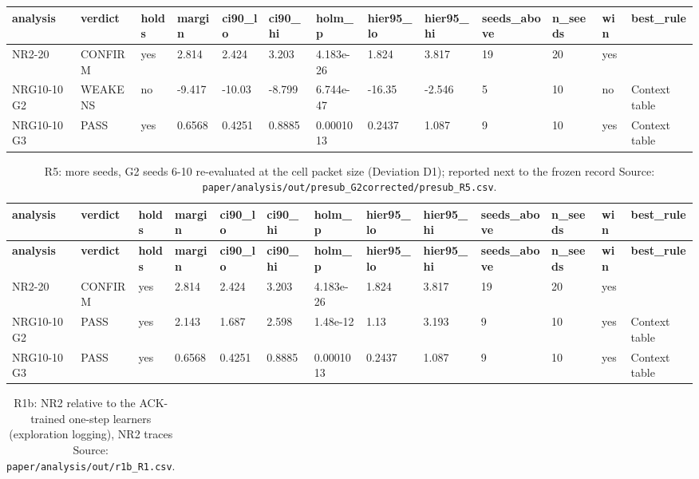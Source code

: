 \documentclass[10pt]{article}
\begin{document}
\begin{landscape}
\begin{longtable}{@{}lllllllllllll@{}}
\endfirsthead
\toprule
\textbf{analysis} & \textbf{verdict} & \textbf{holds} & \textbf{margin} & \textbf{ci90\_lo} & \textbf{ci90\_hi} & \textbf{holm\_p} & \textbf{hier95\_lo} & \textbf{hier95\_hi} & \textbf{seeds\_above} & \textbf{n\_seeds} & \textbf{win} & \textbf{best\_rule} \\
\midrule
\endhead
NR2-20 & CONFIRM & yes & 2.814 & 2.424 & 3.203 & 4.183e-26 & 1.824 & 3.817 & 19 & 20 & yes &  \\
NRG10-10 G2 & WEAKENS & no & -9.417 & -10.03 & -8.799 & 6.744e-47 & -16.35 & -2.546 & 5 & 10 & no & Context table \\
NRG10-10 G3 & PASS & yes & 0.6568 & 0.4251 & 0.8885 & 0.0001013 & 0.2437 & 1.087 & 9 & 10 & yes & Context table \\
\bottomrule
\end{longtable}
\normalsize
\tiny
\setlength{\tabcolsep}{2pt}
\begin{longtable}{@{}lllllllllllll@{}}
\caption{R5: more seeds, G2 seeds 6-10 re-evaluated at the cell packet size (Deviation D1); reported next to the frozen record Source: \texttt{paper/analysis/out/presub\_G2corrected/presub\_R5.csv}.}\\
\toprule
\textbf{analysis} & \textbf{verdict} & \textbf{holds} & \textbf{margin} & \textbf{ci90\_lo} & \textbf{ci90\_hi} & \textbf{holm\_p} & \textbf{hier95\_lo} & \textbf{hier95\_hi} & \textbf{seeds\_above} & \textbf{n\_seeds} & \textbf{win} & \textbf{best\_rule} \\
\midrule
\endfirsthead
\toprule
\textbf{analysis} & \textbf{verdict} & \textbf{holds} & \textbf{margin} & \textbf{ci90\_lo} & \textbf{ci90\_hi} & \textbf{holm\_p} & \textbf{hier95\_lo} & \textbf{hier95\_hi} & \textbf{seeds\_above} & \textbf{n\_seeds} & \textbf{win} & \textbf{best\_rule} \\
\midrule
\endhead
NR2-20 & CONFIRM & yes & 2.814 & 2.424 & 3.203 & 4.183e-26 & 1.824 & 3.817 & 19 & 20 & yes &  \\
NRG10-10 G2 & PASS & yes & 2.143 & 1.687 & 2.598 & 1.48e-12 & 1.13 & 3.193 & 9 & 10 & yes & Context table \\
NRG10-10 G3 & PASS & yes & 0.6568 & 0.4251 & 0.8885 & 0.0001013 & 0.2437 & 1.087 & 9 & 10 & yes & Context table \\
\bottomrule
\end{longtable}
\normalsize
\tiny
\setlength{\tabcolsep}{2pt}
\begin{longtable}{@{}llllllllllll@{}}
\caption{R1b: NR2 relative to the ACK-trained one-step learners (exploration logging), NR2 traces Source: \texttt{paper/analysis/out/r1b\_R1.csv}.}\\

\end{longtable}
\end{landscape}
\end{document}
